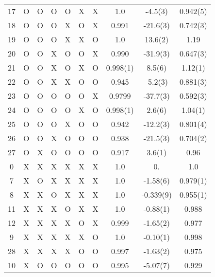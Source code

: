 \documentclass[10pt]{book}
\begin{document}
\begin{table}
\begin{center}
\begin{tabular}{c|cccccc|ccc}
17  & O   & O  & O  & O  & X     & X  &  1.0 & -4.5(3) & 0.942(5) \\
18 & O  &   O & O  & X  &  O  & X  & 0.991  & -21.6(3) & 0.742(3) \\
 19 & O & O & O & X & X & O & 1.0 & 13.6(2) & 1.19 \\
 20 & O  &  O  & X  & O  & O & X & 0.990 & -31.9(3) & 0.647(3) \\
 21 & O & O  & X & O & X & O & 0.998(1) & 8.5(6) & 1.12(1) \\
 22 & O & O  & X & X & O & O & 0.945 & -5.2(3)  & 0.881(3) \\
 23 & O & O & O & O & O & X & 0.9799 & -37.7(3) & 0.592(3) \\
 24 & O & O & O & O & X & O & 0.998(1) & 2.6(6) & 1.04(1) \\
 25 & O & O & O & X & O & O & 0.942 & -12.2(3) & 0.801(4) \\
 26 & O & O & X & O & O & O & 0.938 & -21.5(3) & 0.704(2) \\
 27 & O & X & O & O & O & O & 0.917 & 3.6(1) & 0.96 \\
 0   &  X &   X & X   & X   & X      & X   & 1.0 & 0. & 1.0 \\
  7  &  X &   O & X   & X   & X      & X   & 1.0 & -1.58(6) & 0.979(1) \\
 8  &  X &   X & O   & X   & X      & X   & 1.0 & -0.339(9) & 0.955(1) \\
11  &  X &   X & X   & O   & X      & X   & 1.0 & -0.88(1) & 0.988 \\
12  &  X &   X & X   & X   & O      & X   & 0.999  & -1.65(2) & 0.977 \\
 9  &  X &   X & X   & X   & X      & O   & 1.0 & -0.10(1) & 0.998 \\
28  &  X &   X & X   & X   & O      & O   & 0.997 & -1.63(2) & 0.975\\  
10  &  X &   O & O   & O   & O      & O   & 0.995 & -5.07(7) & 0.929 \\ 
\end{tabular}  
\end{center} 
\end{table} 
\end{document}
